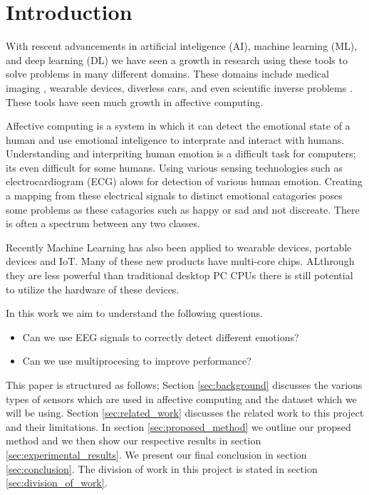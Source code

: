 \section{Introduction}
With rescent advancements in
artificial inteligence (AI),
machine learning (ML),
and deep learning (DL)
we have seen a growth in
research using these tools to
solve problems in many different domains.
These domains include medical imaging \cite{Greenspan:2016},
wearable devices,
diverless cars,
and even scientific inverse problems \cite{laanait2019exascale}.
These tools have seen much growth in affective computing.

Affective computing is a system in which it can detect the
emotional state of a human and use emotional inteligence
to interprate and interact with humans.
Understanding and interpriting human emotion is a
difficult task for computers;
its even difficult for some humans.
Using various sensing technologies such as electrocardiogram (ECG)
alows for detection of various human emotion.
Creating a mapping from these electrical signals to
distinct emotional catagories poses some problems as
these catagories such as happy or sad and not discreate.
There is often a spectrum between any two classes.

Recently Machine Learning has also been applied to wearable devices,
portable devices and IoT.
Many of these new products have multi-core chips.
ALthrough they are less powerful than traditional desktop PC
CPUs there is still potential to utilize the hardware of these devices.

In this work we aim to understand the following questions.
\begin{itemize}
    \item Can we use EEG signals to correctly detect different emotions?
    \item Can we use multiprocesing to improve performance?
\end{itemize}

This paper is structured as follows;
Section \ref{sec:background} discusses the various types of sensors
which are used in affective computing and the dataset which we will be using.
%
Section \ref{sec:related_work} discusses the related work to this project
and their limitations.
%
In section \ref{sec:proposed_method} we outline our propsed method
and we then show our respective results in section \ref{sec:experimental_results}.
%
We present our final conclusion in section \ref{sec:conclusion}.
%
The division of work in this project is stated in section
\ref{sec:division_of_work}.
